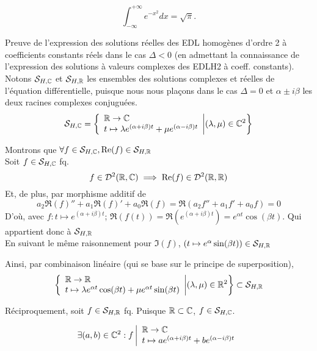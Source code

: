 \documentclass{article}
\begin{document}
\begin{equation}
\int_{-\infty }^{+\infty} e^{-x^2}dx = \sqrt{\pi}.
\end{equation}

	
	\flushleft
	
	\begin{question_kholle}{Preuve de l’expression des solutions réelles des EDL homogènes d’ordre 2 à coefficients constants réels dans le cas $\Delta < 0$ (en admettant la connaissance de l’expression des solutions à valeurs complexes des EDLH2 à coeff. constants).}
		Notons $\mathcal S_{H, \mathbb C}$ et $\mathcal S_{H, \mathbb R}$ les ensembles des solutions complexes et réelles de l'équation différentielle, puisque nous nous plaçons dans le cas $\Delta = 0$ et $\alpha \pm i \beta$ les deux racines complexes conjuguées.
		$$
		\mathcal S_{H, \mathbb C} = 
		\left\{
		\begin{array}{l}
	    \mathbb R \to \mathbb C  \\
	    t \mapsto \lambda e^{(\alpha + i \beta) t}  + \mu e^{(\alpha - i \beta)t}
    	\end{array}
		\middle\vert  (\lambda, \mu) \in \mathbb C ^2 \right\}	
		$$
		
		Montrons que $\forall f \in \mathcal S_{H ,\mathbb C}, \text{Re}(f) \in  \mathcal S_{H ,\mathbb R}$\\
		Soit $f \in \mathcal S_{H ,\mathbb C}$ fq.
		$$f \in \mathcal D^2(\mathbb R, \mathbb C) \implies \text{Re}(f) \in \mathcal D^2(\mathbb R, \mathbb R)$$
		Et, de plus, par morphisme additif de \Re
		$$
		a_2\Re(f)'' + a_1\Re(f)' + a_0\Re(f) = \Re( a_2 f'' + a_1 f' + a_0 f) = 0
		$$
		D'où, avec $f:t \mapsto e^{(\alpha + i \beta)t}$; $\Re(f(t)) = \Re(e^{(\alpha + i \beta)t}) = e^{\alpha t } \cos (\beta t)$. Qui appartient donc à $\mathcal S_{H, \mathbb R}$\\
		En suivant le même raisonnement pour $\Im(f)$, $(t \mapsto e^\alpha \sin(\beta t)) \in \mathcal S_{H, \mathbb R}$
		
		
		Ainsi, par combinaison linéaire (qui se base sur le principe de superposition),
		$$
		\left\{ 
		\begin{array}{l}
	    \mathbb R \to \mathbb R  \\
	    t \mapsto \lambda e^{\alpha t } \cos (\beta t)   + \mu e^{\alpha t } \sin (\beta t)
	  	\end{array}
		\middle\vert  (\lambda, \mu) \in \mathbb R ^2 \right\}
		\subset \mathcal S_{H ,\mathbb R}
		$$
		
		Réciproquement, soit $ f \in \mathcal S_{H ,\mathbb R}$ fq. Puisque $\mathbb R \subset \mathbb C$,  $ f \in \mathcal S_{H ,\mathbb C}$.
		
		$$
		\exists (a, b) \in \mathbb C^2 : f \left| \begin{array}{l}
	    \mathbb R \to \mathbb C  \\
	    t \mapsto a e^{(\alpha + i \beta) t}  + b e^{(\alpha - i \beta)t}
		\end{array}\right.$$
	

\end{question_kholle}
\end{document}
